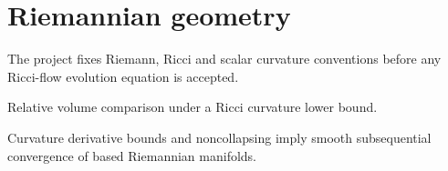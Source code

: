 \chapter{Riemannian geometry}

\begin{definition}
  \label{def:curvature-conventions}
  The project fixes Riemann, Ricci and scalar curvature conventions before any
  Ricci-flow evolution equation is accepted.
\end{definition}

\begin{theorem}
  \label{thm:bishop-gromov}
  \notready
  Relative volume comparison under a Ricci curvature lower bound.
\end{theorem}

\begin{theorem}
  \label{thm:cheeger-gromov-compactness}
  \notready
  Curvature derivative bounds and noncollapsing imply smooth subsequential
  convergence of based Riemannian manifolds.
\end{theorem}
